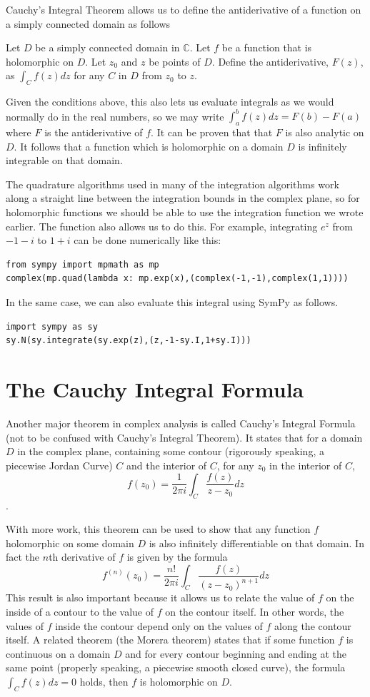 Cauchy's Integral Theorem allows us to define the antiderivative of a function on a simply connected domain as follows
\begin{theorem}
Let $D$ be a simply connected domain in $\mathbb{C}$. Let $f$ be a function that is holomorphic on $D$.
Let $z_0$ and $z$ be points of $D$. Define the antiderivative, $F(z)$, as $\int_C f(z)dz$ for any $C$ in $D$ from $z_0$ to $z$.
\end{theorem}
Given the conditions above, this also lets us evaluate integrals as we would normally do in the real numbers, so we may write $\int_a^b f(z)dz=F(b)-F(a)$ where $F$ is the antiderivative of $f$.
It can be proven that that $F$ is also analytic on $D$.
It follows that a function which is holomorphic on a domain $D$ is infinitely integrable on that domain.

The quadrature algorithms used in many of the integration algorithms work along a straight line between the integration bounds in the complex plane, so for holomorphic functions we should be able to use the integration function we wrote earlier.
The  function also allows us to do this.
For example, integrating $e^z$ from $-1-i$ to $1+i$ can be done numerically like this:
\begin{lstlisting}
from sympy import mpmath as mp
complex(mp.quad(lambda x: mp.exp(x),(complex(-1,-1),complex(1,1))))
\end{lstlisting}
In the same case, we can also evaluate this integral using SymPy as follows.
\begin{lstlisting}
import sympy as sy
sy.N(sy.integrate(sy.exp(z),(z,-1-sy.I,1+sy.I)))
\end{lstlisting}

\section*{The Cauchy Integral Formula}

Another major theorem in complex analysis is called Cauchy's Integral Formula (not to be confused with Cauchy's Integral Theorem).
It states that for a domain $D$ in the complex plane, containing some contour (rigorously speaking, a piecewise Jordan Curve) $C$ and the interior of $C$, for any $z_0$ in the interior of $C$, 
$$f(z_0)=\frac{1}{2\pi i} \int_C \frac{f(z)}{z-z_0} dz$$. 

With more work, this theorem can be used to show that any function $f$ holomorphic on some domain $D$ is also infinitely differentiable on that domain.
In fact the $n$th derivative of $f$ is given by the formula $$f^{(n)}(z_0) = \frac{n!}{2\pi i} \int_C \frac{f(z)}{(z-z_0)^{n+1}} dz$$
This result is also important because it allows us to relate the value of $f$ on the inside of a contour to the value of $f$ on the contour itself.
In other words, the values of $f$ inside the contour depend only on the values of $f$ along the contour itself.
A related theorem (the Morera theorem) states that if some function $f$ is continuous on a domain $D$ and for every contour beginning and ending at the same point (properly speaking, a piecewise smooth closed curve), the formula $\int_C f(z) dz = 0$ holds, then $f$ is holomorphic on $D$. 


